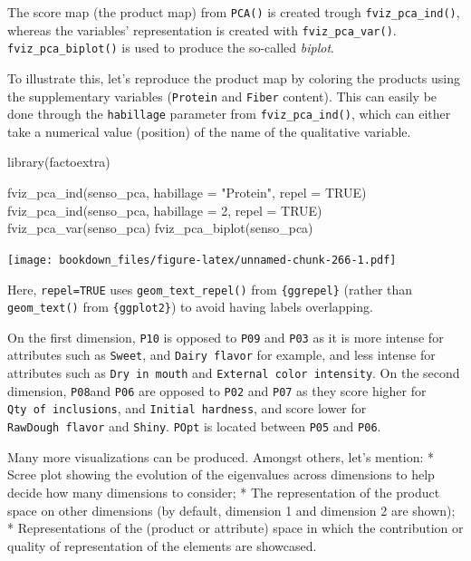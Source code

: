 \documentclass[
]{krantz}
\makeatletter
\newenvironment{Shaded}{\begin{snugshade}}{\end{snugshade}}
\newcommand{\AttributeTok}[1]{\textcolor[rgb]{0.61,0.61,0.61}{#1}}
\newcommand{\ConstantTok}[1]{\textcolor[rgb]{0,0,0}{#1}}
\newcommand{\DecValTok}[1]{\textcolor[rgb]{0.06,0.06,0.06}{#1}}
\newcommand{\FunctionTok}[1]{\textcolor[rgb]{0,0,0}{#1}}
\newcommand{\NormalTok}[1]{#1}
\newcommand{\StringTok}[1]{\textcolor[rgb]{0.5,0.5,0.5}{#1}}
\renewenvironment{quote}{\begin{VF}}{\end{VF}}
\newenvironment{kframe}{%
\medskip{}
\setlength{\fboxsep}{.8em}
 \def\at@end@of@kframe{}%
 \ifinner\ifhmode%
  \def\at@end@of@kframe{\end{minipage}}%
  \begin{minipage}{\columnwidth}%
 \fi\fi%
 \def\FrameCommand##1{\hskip\@totalleftmargin \hskip-\fboxsep
 \colorbox{shadecolor}{##1}\hskip-\fboxsep
     \hskip-\linewidth \hskip-\@totalleftmargin \hskip\columnwidth}%
 \MakeFramed {\advance\hsize-\width
   \@totalleftmargin\z@ \linewidth\hsize
   \@setminipage}}%
 {\par\unskip\endMakeFramed%
 \at@end@of@kframe}
\renewenvironment{Shaded}{\begin{kframe}}{\end{kframe}}
\makeatother
\begin{document}
The score map (the product map) from \texttt{PCA()} is created trough \texttt{fviz\_pca\_ind()}, whereas the variables' representation is created with \texttt{fviz\_pca\_var()}. \texttt{fviz\_pca\_biplot()} is used to produce the so-called \emph{biplot}.

To illustrate this, let's reproduce the product map by coloring the products using the supplementary variables (\texttt{Protein} and \texttt{Fiber} content). This can easily be done through the \texttt{habillage} parameter from \texttt{fviz\_pca\_ind()}, which can either take a numerical value (position) of the name of the qualitative variable.

\begin{Shaded}
\begin{Highlighting}[]
\FunctionTok{library}\NormalTok{(factoextra)}

\FunctionTok{fviz\_pca\_ind}\NormalTok{(senso\_pca, }\AttributeTok{habillage =} \StringTok{"Protein"}\NormalTok{, }\AttributeTok{repel =} \ConstantTok{TRUE}\NormalTok{)}
\FunctionTok{fviz\_pca\_ind}\NormalTok{(senso\_pca, }\AttributeTok{habillage =} \DecValTok{2}\NormalTok{, }\AttributeTok{repel =} \ConstantTok{TRUE}\NormalTok{)}
\FunctionTok{fviz\_pca\_var}\NormalTok{(senso\_pca)}
\FunctionTok{fviz\_pca\_biplot}\NormalTok{(senso\_pca)}
\end{Highlighting}
\end{Shaded}

\texttt{[image: bookdown\_files/figure-latex/unnamed-chunk-266-1.pdf]}

Here, \texttt{repel=TRUE} uses \texttt{geom\_text\_repel()} from \texttt{\{ggrepel\}} (rather than \texttt{geom\_text()} from \texttt{\{ggplot2\}}) to avoid having labels overlapping.

On the first dimension, \texttt{P10} is opposed to \texttt{P09} and \texttt{P03} as it is more intense for attributes such as \texttt{Sweet}, and \texttt{Dairy\ flavor} for example, and less intense for attributes such as \texttt{Dry\ in\ mouth} and \texttt{External\ color\ intensity}. On the second dimension, \texttt{P08}and \texttt{P06} are opposed to \texttt{P02} and \texttt{P07} as they score higher for \texttt{Qty\ of\ inclusions}, and \texttt{Initial\ hardness}, and score lower for \texttt{RawDough\ flavor} and \texttt{Shiny}. \texttt{POpt} is located between \texttt{P05} and \texttt{P06}.

\begin{quote}
Many more visualizations can be produced. Amongst others, let's mention:
* Scree plot showing the evolution of the eigenvalues across dimensions to help decide how many dimensions to consider;
* The representation of the product space on other dimensions (by default, dimension 1 and dimension 2 are shown);
* Representations of the (product or attribute) space in which the contribution or quality of representation of the elements are showcased.
\end{quote}
\end{document}
